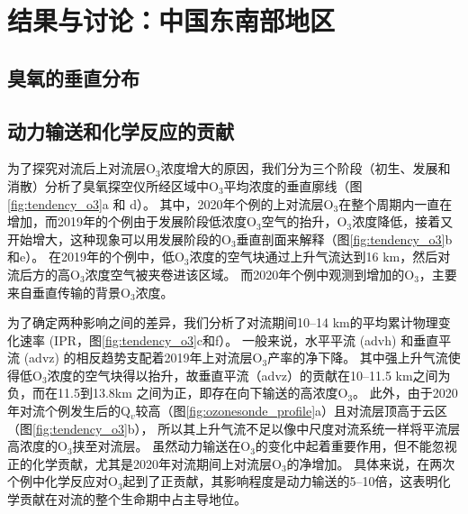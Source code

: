 \section{结果与讨论：中国东南部地区}

\subsection{臭氧的垂直分布}

\subsection{动力输送和化学反应的贡献} \label{subsect:convec_impacts}

为了探究对流后上对流层O$_3$浓度增大的原因，我们分为三个阶段（初生、发展和消散）分析了臭氧探空仪所经区域中O$_3$平均浓度的垂直廓线（图\ref{fig:tendency_o3}a 和 d）。
其中，2020年个例的上对流层O$_3$在整个周期内一直在增加，而2019年的个例由于发展阶段低浓度O$_3$空气的抬升，O$_3$浓度降低，接着又开始增大，这种现象可以用发展阶段的O$_3$垂直剖面来解释（图\ref{fig:tendency_o3}b和e）。
在2019年的个例中，低O$_3$浓度的空气块通过上升气流达到16 km，然后对流后方的高O$_3$浓度空气被夹卷进该区域。
而2020年个例中观测到增加的O$_3$，主要来自垂直传输的背景O$_3$浓度。

为了确定两种影响之间的差异，我们分析了对流期间10--14 km的平均累计物理变化速率 (IPR，图\ref{fig:tendency_o3}c和f）。
一般来说，水平平流 (advh) 和垂直平流 (advz) 的相反趋势支配着2019年上对流层O$_3$产率的净下降。
其中强上升气流使得低O$_3$浓度的空气块得以抬升，故垂直平流（advz）的贡献在10--11.5 km之间为负，而在11.5到13.8km 之间为正，即存在向下输送的高浓度O$_3$。
此外，由于2020年对流个例发生后的Q$_v$较高（图\ref{fig:ozonesonde_profile}a）且对流层顶高于云区（图\ref{fig:tendency_o3}b），
所以其上升气流不足以像中尺度对流系统一样将平流层高浓度的O$_3$挟至对流层\citep{Phoenix.2020}。
虽然动力输送在O$_3$的变化中起着重要作用，但不能忽视正的化学贡献，尤其是2020年对流期间上对流层O$_3$的净增加。
具体来说，在两次个例中化学反应对O$_3$起到了正贡献，其影响程度是动力输送的5--10倍，这表明化学贡献在对流的整个生命期中占主导地位。


